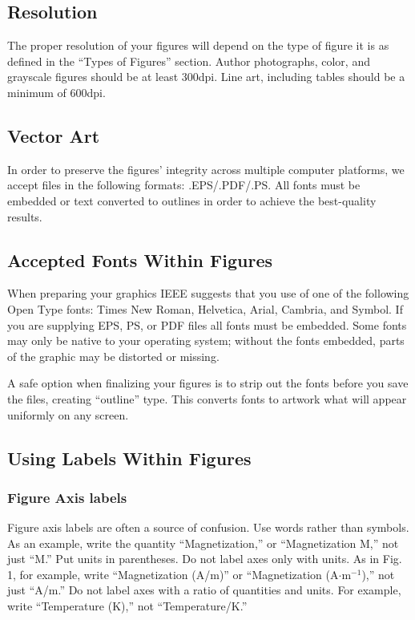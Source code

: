 \documentclass[journal]{IEEEtran}
\begin{document}
\subsection{Resolution }
The proper resolution of your figures will depend on the type of figure it is as defined in the ``Types of Figures'' section. Author photographs, color, and grayscale figures should be at least 300dpi. Line art, including tables should be a minimum of 600dpi. %

\subsection{Vector Art}
In order to preserve the figures' integrity across multiple computer platforms, we accept files in the following formats: .EPS/.PDF/.PS. All fonts must be embedded or text converted to outlines in order to achieve the best-quality results.


\subsection{Accepted Fonts Within Figures}
When preparing your graphics IEEE suggests that you use of one of the following Open Type fonts: Times New Roman, Helvetica, Arial, Cambria, and Symbol. If you are supplying EPS, PS, or PDF files all fonts must be embedded. Some fonts may only be native to your operating system; without the fonts embedded, parts of the graphic may be distorted or missing. 

A safe option when finalizing your figures is to strip out the fonts before you save the files, creating ``outline'' type. This converts fonts to artwork what will appear uniformly on any screen.

\subsection{Using Labels Within Figures}

\subsubsection{Figure Axis labels }
Figure axis labels are often a source of confusion. Use words rather than symbols. As an example, write the quantity ``Magnetization,'' or ``Magnetization M,'' not just ``M.'' Put units in parentheses. Do not label axes only with units. As in Fig. 1, for example, write ``Magnetization (A/m)'' or ``Magnetization (A$\cdot$m$^{-1}$),'' not just ``A/m.'' Do not label axes with a ratio of quantities and units. For example, write ``Temperature (K),'' not ``Temperature/K.'' %
\end{document}
